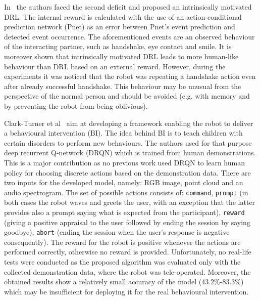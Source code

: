 \documentclass[thesis]{mas_proposal}
\begin{document}
In~\cite{Qureshi2018} the authors faced the second deficit and proposed an intrinsically motivated DRL. The internal reward is calculated with the use of an action-conditional prediction network (Pnet) as an error between Pnet's event prediction and detected event occurrence. The aforementioned events are an observed behaviour of the interacting partner, such as handshake, eye contact and smile. It is moreover shown that intrinsically motivated DRL leads to more human-like behaviour than DRL based on an external reward. However, during the experiments it was noticed that the robot was repeating a handshake action even after already successful handshake. This behaviour may be unusual from the perspective of the normal person and should be avoided (e.g. with memory and by preventing the robot from being oblivious).
 
Clark-Turner et al~\cite{ClarkTurner2017} aim at developing a framework enabling the robot to deliver a behavioural intervention (BI). The idea behind BI is to teach children with certain disorders to perform new behaviours. The authors used for that purpose deep recurrent Q-network (DRQN) which is trained from human demonstrations. This is a major contribution as no previous work used DRQN to learn human policy for choosing discrete actions based on the demonstration data. There are two inputs for the developed model, namely: RGB image, point cloud and an audio spectrogram. The set of possible actions consists of: \texttt{command}, \texttt{prompt} (in both cases the robot waves and greets the user, with an exception that the latter provides also a prompt saying what is expected from the participant), \texttt{reward} (giving a positive appraisal to the user followed by ending the session by saying goodbye), \texttt{abort} (ending the session when the user's response is negative consequently). The reward for the robot is positive whenever the actions are performed correctly, otherwise no reward is provided. Unfortunately, no real-life tests were conducted as the proposed algorithm was evaluated only with the collected demonstration data, where the robot was tele-operated. Moreover, the obtained results show a relatively small accuracy of the model (43.2\%-83.3\%) which may be insufficient for deploying it for the real behavioural intervention.
\end{document}
